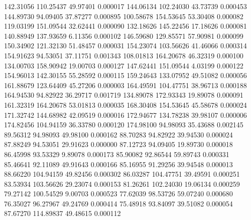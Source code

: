       142.31056      110.25437       49.97401       0.000017
      144.06134      102.24030       43.73739       0.000453
      144.89730       94.09405       37.87277       0.000895
      100.58678      154.53645       53.30408       0.000082
      119.03199      151.09544       32.62441       0.000090
      132.18626      145.22456       17.18626       0.000081
      140.88949      137.93659        6.11356       0.000102
      146.59680      129.85571       57.90981       0.000099
      150.34902      121.32130       51.48457       0.000031
      154.23074      103.56626       41.46066       0.000314
      154.91623       94.53051       37.11751       0.001343
      108.01813      164.20678       46.32319       0.000100
      134.00703      158.90942       19.00703       0.000127
      147.62441      151.09544        4.03199       0.000122
      154.96013      142.30155       55.28592       0.000115
      159.24643      133.07952       49.51082       0.000056
      161.88679      123.64409       45.27206       0.000003
      164.49591      104.47751       38.96713       0.000188
      164.94530       94.82922       36.29717       0.001719
      134.89078      172.93343       19.89078       0.000091
      161.32319      164.20678       53.01813       0.000035
      168.30408      154.53645       45.58678       0.000024
      171.32742      144.68982       42.09519       0.000016
      172.94677      134.78238       39.98107       0.000006
      174.82456      104.94159       36.33780       0.000120
      174.98100       94.98093       35.43688       0.002145
       89.56312       94.98093       49.98100       0.000162
       88.70283       94.82922       39.94530       0.000024
       87.88249       94.53051       29.91623       0.000000
       87.12723       94.09405       19.89730       0.000018
       86.45998       93.53329        9.89078       0.000173
       85.90082       92.86544       59.89743       0.000331
       85.46641       92.11089       49.91643       0.000166
       85.16955       91.29256       39.94548       0.000013
       88.66220      104.94159       49.82456       0.000302
       86.03287      104.47751       39.49591       0.000251
       83.53934      103.56626       29.23074       0.000153
       81.26261      102.24030       19.06134       0.000259
       79.27142      100.54529        9.00703       0.000523
       77.62039       98.53726       59.07240       0.000680
       76.35027       96.27967       49.24769       0.000414
       75.48918       93.84097       39.51082       0.000054
       87.67270      114.89837       49.48615       0.000112

